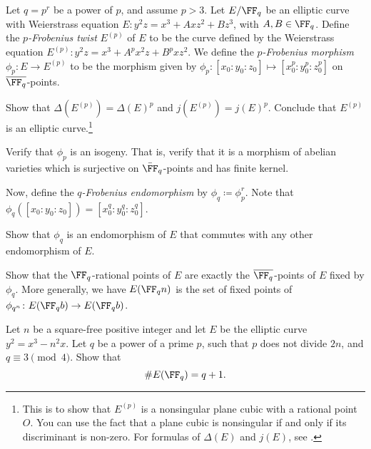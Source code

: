 \documentclass[../notes.tex]{subfiles}
\begin{document}
\begin{prob}
	Let $q=p^r$ be a power of $p$, and assume $p > 3$. Let $E/\FF_q$ be an elliptic curve with Weierstrass equation $E: y^2z=x^3+Axz^2+Bz^3$, with $A,B \in \FF_q$. Define the \textit{$p$-Frobenius twist} $E^{(p)}$ of $E$ to be the curve defined by the Weierstrass equation $E^{(p)}: y^2z=x^3+A^px^2z+B^pxz^2$. We define the \textit{$p$-Frobenius morphism} $\phi_p: E \to E^{(p)}$ to be the morphism given by $\phi_p: [x_0: y_0: z_0] \mapsto [x_0^p: y_0^p: z_0^p]$ on $\overline{\FF_q}$-points.
    \begin{listalph}
        \item Show that $\Delta(E^{(p)})=\Delta(E)^p$ and $j(E^{(p)})=j(E)^p$. Conclude that $E^{(p)}$ is an elliptic curve.\footnote{This is to show that $E^{(p)}$ is a nonsingular plane cubic with a rational point $O$. You can use the fact that a plane cubic is nonsingular if and only if its discriminant is non-zero. For formulas of $\Delta(E)$ and $j(E)$, see \cite[Section III.1]{Silverman2009}.}
        \item Verify that $\phi_p$ is an isogeny. That is, verify that it is a morphism of abelian varieties which is surjective on $\bar{\FF}_q$-points and has finite kernel.
    \end{listalph}
    Now, define the \textit{$q$-Frobenius endomorphism} by $\phi_q \coloneqq \phi_p^{r}$. Note that $\phi_q([x_0: y_0: z_0])= [x_0^q: y_0^q: z_0^q]$.
    \begin{listalph}
        \item Show that $\phi_q$ is an endomorphism of $E$ that commutes with any other endomorphism of $E$. 
        \item Show that the $\FF_q$-rational points of $E$ are exactly the $\overline{\FF_q}$-points of $E$ fixed by $\phi_q$. More generally, we have $E(\FF_qn)$ is the set of fixed points of $\phi_{q^n}\colon E(\FF_qb) \to E(\FF_qb)$.
    \end{listalph}
\end{prob}

\begin{prob}
	Let $n$ be a square-free positive integer and let $E$ be the elliptic curve $y^2 = x^3-n^2x$. Let $q$ be a power of a prime $p$, such that $p$ does not divide $2n$, and $q \equiv 3 \pmod 4$. Show that 
    \[\#E(\FF_q) = q+1.\]
\end{prob}
\end{document}
